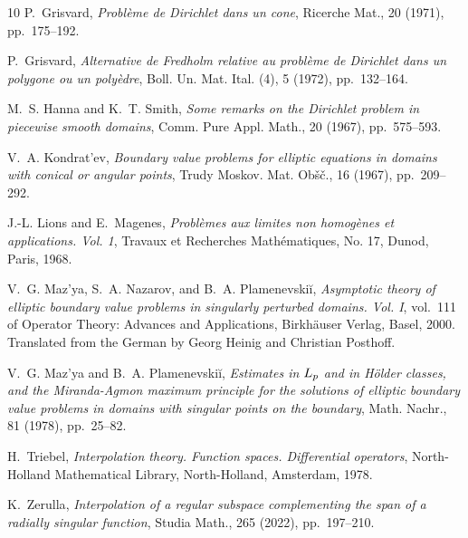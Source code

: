\documentclass[titlepage,12pt]{amsart}
\theoremstyle{definition}
\theoremstyle{remark}
\numberwithin{equation}{section}
\begin{document}
\begin{thebibliography}{10}
{\sc P.~Grisvard}, {\em Probl\`eme de {D}irichlet dans un cone}, Ricerche Mat.,
  20 (1971), pp.~175--192.

{\sc P.~Grisvard}, {\em Alternative de {F}redholm relative au probl\`eme de
  {D}irichlet dans un polygone ou un poly\`edre}, Boll. Un. Mat. Ital. (4), 5
  (1972), pp.~132--164.

{\sc M.~S. Hanna and K.~T. Smith}, {\em Some remarks on the {D}irichlet problem
  in piecewise smooth domains}, Comm. Pure Appl. Math., 20 (1967),
  pp.~575--593.

{\sc V.~A. Kondrat'ev}, {\em Boundary value problems for elliptic equations in
  domains with conical or angular points}, Trudy Moskov. Mat. Ob\v s\v c., 16
  (1967), pp.~209--292.

{\sc J.-L. Lions and E.~Magenes}, {\em Probl\`emes aux limites non homog\`enes
  et applications. {V}ol. 1}, Travaux et Recherches Math\'ematiques, No. 17,
  Dunod, Paris, 1968.

{\sc V.~G. Maz'ya, S.~A. Nazarov, and B.~A. Plamenevski\u{i}}, {\em Asymptotic
  theory of elliptic boundary value problems in singularly perturbed domains.
  {V}ol. {I}}, vol.~111 of Operator Theory: Advances and Applications,
  Birkh\"auser Verlag, Basel, 2000.
\newblock Translated from the German by Georg Heinig and Christian Posthoff.

{\sc V.~G. Maz'ya and B.~A. Plamenevski\u{i}}, {\em Estimates in {$L\sb{p}$}
  and in {H}\"older classes, and the {M}iranda-{A}gmon maximum principle for
  the solutions of elliptic boundary value problems in domains with singular
  points on the boundary}, Math. Nachr., 81 (1978), pp.~25--82.

{\sc H.~Triebel}, {\em Interpolation theory. Function spaces. Differential
  operators}, North-Holland Mathematical Library, North-Holland, Amsterdam,
  1978.

{\sc K.~Zerulla}, {\em Interpolation of a regular subspace complementing the
  span of a radially singular function}, Studia Math., 265 (2022),
  pp.~197--210.

\end{thebibliography}
\end{document}
